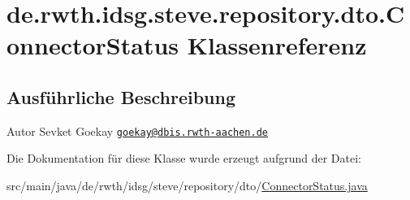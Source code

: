 \hypertarget{classde_1_1rwth_1_1idsg_1_1steve_1_1repository_1_1dto_1_1_connector_status}{\section{de.\-rwth.\-idsg.\-steve.\-repository.\-dto.\-Connector\-Status Klassenreferenz}
\label{classde_1_1rwth_1_1idsg_1_1steve_1_1repository_1_1dto_1_1_connector_status}
}


\subsection{Ausführliche Beschreibung}
\begin{DoxyAuthor}{Autor}
Sevket Goekay \href{mailto:goekay@dbis.rwth-aachen.de}{\tt goekay@dbis.\-rwth-\/aachen.\-de} 
\end{DoxyAuthor}


Die Dokumentation für diese Klasse wurde erzeugt aufgrund der Datei\-:\begin{DoxyCompactItemize}
\item 
src/main/java/de/rwth/idsg/steve/repository/dto/\hyperlink{_connector_status_8java}{Connector\-Status.\-java}\end{DoxyCompactItemize}
